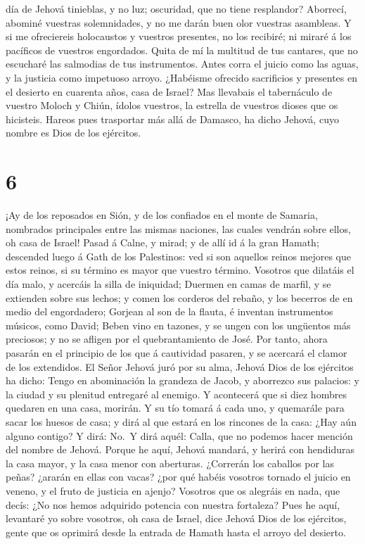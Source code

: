 día de Jehová tinieblas, y no luz; oscuridad, que no tiene resplandor?
 Aborrecí, abominé vuestras solemnidades, y no me darán
buen olor vuestras asambleas.  Y si me ofreciereis
holocaustos y vuestros presentes, no los recibiré; ni miraré á los
pacíficos de vuestros engordados.  Quita de mí la
multitud de tus cantares, que no escucharé las salmodias de tus
instrumentos.  Antes corra el juicio como las aguas, y la
justicia como impetuoso arroyo.  ¿Habéisme ofrecido
sacrificios y presentes en el desierto en cuarenta años, casa de Israel?
 Mas llevabais el tabernáculo de vuestro Moloch y Chiún,
ídolos vuestros, la estrella de vuestros dioses que os hicisteis.
 Hareos pues trasportar más allá de Damasco, ha dicho
Jehová, cuyo nombre es Dios de los ejércitos.

\hypertarget{section-5}{%
\section{6}\label{section-5}}

 ¡Ay de los reposados en Sión, y de los confiados en el
monte de Samaria, nombrados principales entre las mismas naciones, las
cuales vendrán sobre ellos, oh casa de Israel!  Pasad á
Calne, y mirad; y de allí id á la gran Hamath; descended luego á Gath de
los Palestinos: ved si son aquellos reinos mejores que estos reinos, si
su término es mayor que vuestro término.  Vosotros que
dilatáis el día malo, y acercáis la silla de iniquidad; 
Duermen en camas de marfil, y se extienden sobre sus lechos; y comen los
corderos del rebaño, y los becerros de en medio del engordadero;
 Gorjean al son de la flauta, é inventan instrumentos
músicos, como David;  Beben vino en tazones, y se ungen
con los ungüentos más preciosos; y no se afligen por el quebrantamiento
de José.  Por tanto, ahora pasarán en el principio de los
que á cautividad pasaren, y se acercará el clamor de los extendidos.
 El Señor Jehová juró por su alma, Jehová Dios de los
ejércitos ha dicho: Tengo en abominación la grandeza de Jacob, y
aborrezco sus palacios: y la ciudad y su plenitud entregaré al enemigo.
 Y acontecerá que si diez hombres quedaren en una casa,
morirán.  Y su tío tomará á cada uno, y quemarále para
sacar los huesos de casa; y dirá al que estará en los rincones de la
casa: ¿Hay aún alguno contigo? Y dirá: No.~Y dirá aquél: Calla, que no
podemos hacer mención del nombre de Jehová.  Porque he
aquí, Jehová mandará, y herirá con hendiduras la casa mayor, y la casa
menor con aberturas.  ¿Correrán los caballos por las
peñas? ¿ararán en ellas con vacas? ¿por qué habéis vosotros tornado el
juicio en veneno, y el fruto de justicia en ajenjo? 
Vosotros que os alegráis en nada, que decís: ¿No nos hemos adquirido
potencia con nuestra fortaleza?  Pues he aquí, levantaré
yo sobre vosotros, oh casa de Israel, dice Jehová Dios de los ejércitos,
gente que os oprimirá desde la entrada de Hamath hasta el arroyo del
desierto.

